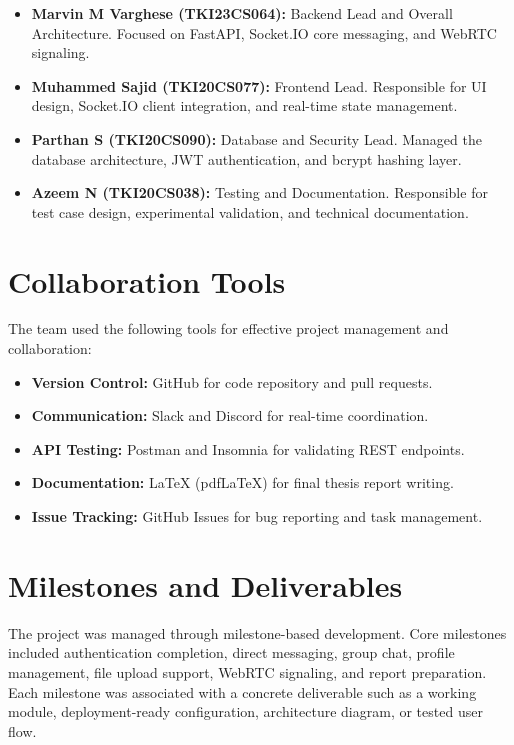 \documentclass[12pt,a4paper,oneside]{report}
\begin{document}
\begin{itemize}
    \item \textbf{Marvin M Varghese (TKI23CS064):} Backend Lead and Overall Architecture.
          Focused on FastAPI, Socket.IO core messaging, and WebRTC signaling.
    \item \textbf{Muhammed Sajid (TKI20CS077):} Frontend Lead. Responsible for UI
          design, Socket.IO client integration, and real-time state management.
    \item \textbf{Parthan S (TKI20CS090):} Database and Security Lead. Managed the
          database architecture, JWT authentication, and bcrypt hashing layer.
    \item \textbf{Azeem N (TKI20CS038):} Testing and Documentation. Responsible for
          test case design, experimental validation, and technical documentation.
\end{itemize}

\section{Collaboration Tools}
\label{sec:collaboration-tools}

The team used the following tools for effective project management and collaboration:
\begin{itemize}
    \item \textbf{Version Control:} GitHub for code repository and pull requests.
    \item \textbf{Communication:} Slack and Discord for real-time coordination.
    \item \textbf{API Testing:} Postman and Insomnia for validating REST endpoints.
    \item \textbf{Documentation:} LaTeX (pdfLaTeX) for final thesis report writing.
    \item \textbf{Issue Tracking:} GitHub Issues for bug reporting and task management.
\end{itemize}

\section{Milestones and Deliverables}
\label{sec:milestones-deliverables}
The project was managed through milestone-based development. Core milestones
included authentication completion, direct messaging, group chat, profile
management, file upload support, WebRTC signaling, and report preparation.
Each milestone was associated with a concrete deliverable such as a working
module, deployment-ready configuration, architecture diagram, or tested user flow.
\end{document}
